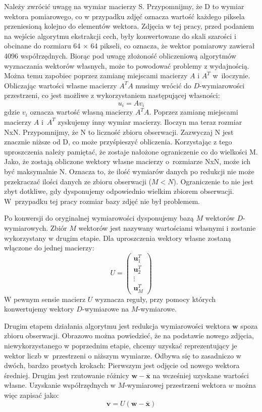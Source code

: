 \documentclass[oneside, eng]{mgr}
\newcommand{\bb}{\textbf}
\begin{document}
Należy zwrócić uwagę na wymiar macierzy S. Przypomnijmy, że D to wymiar wektora pomiarowego, co w przypadku zdjęć oznacza wartość każdego piksela przeniesioną kolejno do elementów wektora. Zdjęcia w tej pracy, przed podaniem na wejście algorytmu ekstrakcji cech, były konwertowane do skali szarości i obcinane do rozmiaru 64 $\times$ 64 pikseli, co oznacza, że wektor pomiarowy zawierał 4096 współrzędnych. Biorąc pod uwagę złożoność obliczeniową algorytmów wyznaczania wektorów własnych, może to powodować problemy z wydajnością. Można temu zapobiec poprzez zamianę miejscami macierzy $A$ i $A^T$ w~iloczynie. Obliczając wartości własne macierzy $A^T A$ musimy wrócić do $D$-wymiarowości przestrzeni, co jest możliwe z wykorzystaniem następującej własności:
\begin{equation}
	u_i = A v_i
\end{equation}
gdzie $v_i$ oznacza wartość własną macierzy $A^T A$. Poprzez zamianę miejscami macierzy $A$ i~$A^T$ zyskujemy inny wymiar macierzy. Iloczyn ma teraz rozmiar NxN. Przypomnijmy, że N to liczność zbioru obserwacji. Zazwyczaj N jest znacznie niższe od D, co może przyśpieszyć obliczenia. Korzystając z tego uproszczenia należy pamiętać, że zostaje nałożone ograniczenie co do wielkości M. Jako, że zostają obliczone wektory własne macierzy o~rozmiarze NxN, może ich być maksymalnie N. Oznacza to, że ilość wymiarów danych po redukcji nie może przekraczać ilości danych ze zbioru obserwacji ($M < N$). Ograniczenie to nie jest zbyt dotkliwe, gdy dysponujemy odpowiednio wielkim zbiorem obserwacji. W~przypadku tej pracy rozmiar bazy zdjęć nie był problemem.

Po konwersji do oryginalnej wymiarowości dysponujemy bazą $M$ wektorów $D$- wymiarowych. Zbiór $M$ wektorów jest nazywany wartościami własnymi i zostanie wykorzystany w drugim etapie. Dla uproszczenia wektory własne zostaną włączone do jednej macierzy:
\begin{equation}
	U = 
	\left( \begin{array}{l}
		\bb{u}_1^T \\
		\bb{u}_2^T \\
		\vdots	 \\
		\bb{u}_M^T
	\end{array} \right)
\end{equation}
W pewnym sensie macierz $U$ wyznacza reguły, przy pomocy których konwertujemy wektory $D$-wymiarowe na $M$-wymiarowe.

Drugim etapem działania algorytmu jest redukcja wymiarowości wektora $\bb{w}$ spoza zbioru obserwacji. Obrazowo można powiedzieć, że na podstawie nowego zdjęcia, niewykorzystanego w poprzednim etapie, chcemy uzyskać reprezentujący je wektor liczb w~przestrzeni o niższym wymiarze. Odbywa się to zasadniczo w dwóch, bardzo prostych krokach: Pierwszym jest odjęcie od nowego wektora średniej. Drugim jest rzutowanie różnicy $\bb{w} - \overline{\bb{x}}$ na wcześniej uzyskane wartości własne. Uzyskanie współrzędnych w $M$-wymiarowej przestrzeni wektora $w$ można więc zapisać jako:
\begin{equation}
	\bb{v} = U ( \bb{w} - \overline{\bb{x}} ) 
\end{equation}
\end{document}
